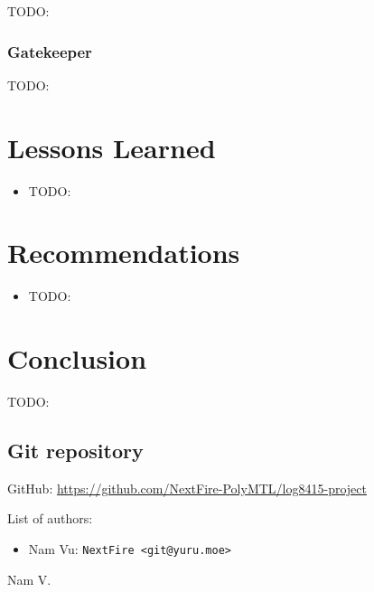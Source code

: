 \documentclass[letterpaper,headings=standardclasses,parskip=half]{scrartcl}
\begin{document}
TODO:

\subsubsection{Gatekeeper}

TODO:

\section{Lessons Learned}

\begin{itemize}
    \item TODO:
\end{itemize}

\section{Recommendations}

\begin{itemize}
    \item TODO:
\end{itemize}

\section{Conclusion}

TODO:


\subsection*{Git repository}

GitHub: \url{https://github.com/NextFire-PolyMTL/log8415-project}

List of authors:

\begin{itemize}
    \item Nam Vu: \texttt{NextFire <git@yuru.moe>}
\end{itemize}


Nam V.

\end{document}
